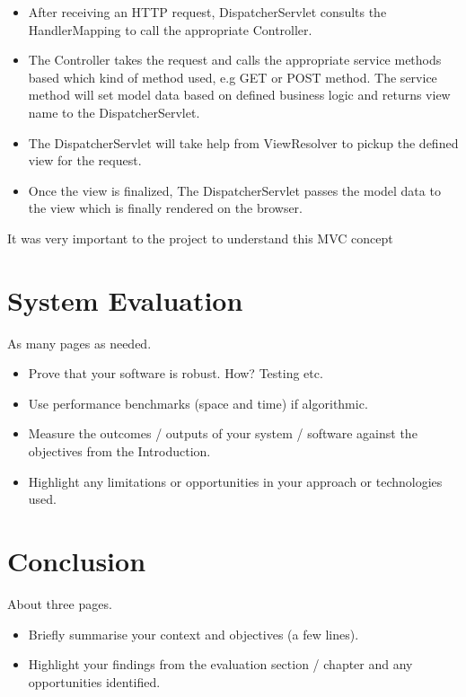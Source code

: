 \begin{itemize}	
\item{ After receiving an HTTP request, DispatcherServlet consults the HandlerMapping to call the appropriate Controller.}
\item{ The Controller takes the request and calls the appropriate service methods based which kind of method used, e.g GET or POST method. The service method will set model data based on defined business logic and returns view name to the DispatcherServlet.}
\item{ The DispatcherServlet will take help from ViewResolver to pickup the defined view for the request.}
\item{Once the view is finalized, The DispatcherServlet passes the model data to the view which is finally rendered on the browser.}
\end{itemize}	

It was very important to the project to understand this MVC concept

\chapter{System Evaluation}
As many pages as needed.
\begin{itemize}
\item Prove that your software is robust. How? Testing etc. 
\item Use performance benchmarks (space and time) if algorithmic.
\item Measure the outcomes / outputs of your system / software against the objectives from the Introduction.
\item Highlight any limitations or opportunities in your approach or technologies used.
\end{itemize}

\chapter{Conclusion}
About three pages.

\begin{itemize}
\item Briefly summarise your context and objectives (a few lines).
\item Highlight your findings from the evaluation section / chapter and any opportunities identified.
\end{itemize}



